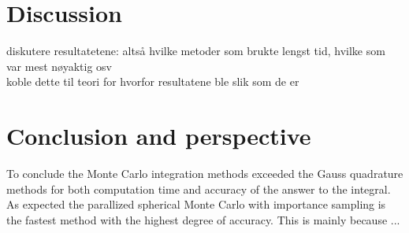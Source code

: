 \documentclass{article}
\begin{document}

\vspace{1cm}

\section{Discussion} \label{sec:Discussion}

diskutere resultatetene: altså hvilke metoder som brukte lengst tid, hvilke som var mest nøyaktig osv \\
koble dette til teori for hvorfor resultatene ble slik som de er \\


\vspace{1cm}

\section{Conclusion and perspective} \label{sec:Conclusion}

To conclude the Monte Carlo integration methods exceeded the Gauss quadrature methods for both computation time and accuracy of the answer to the integral. As expected the parallized spherical Monte Carlo with importance sampling is the fastest method with the highest degree of accuracy. This is mainly because ... \\
\end{document}
